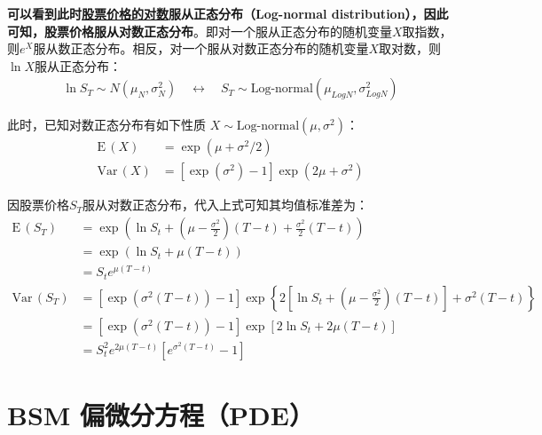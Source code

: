 \documentclass[11pt]{article}
\def\Var{{\textrm{Var}}\,}
\def\E{{\textrm{E}}\,}
\begin{document}
\textbf{可以看到此时\underline{股票价格的对数}服从正态分布（Log-normal distribution），因此可知，股票价格服从对数正态分布}。即对一个服从正态分布的随机变量$X$取指数，则$e^X$服从数正态分布。相反，对一个服从对数正态分布的随机变量$X$取对数，则$\ln X$服从正态分布：
\begin{align*}
    \ln S_T \sim N(\mu_{N},\sigma_{N}^2) \quad \leftrightarrow \quad S_T \sim \text{Log-normal}(\mu_{LogN},\sigma_{LogN}^2)
\end{align*}

此时，已知对数正态分布有如下性质 $X \sim \text{Log-normal}(\mu,\sigma^2)$：
\begin{align*}
    \E(X) & = \exp(\mu+\sigma^2/2) \\
    \Var(X) & = [\exp(\sigma^2)-1]\exp(2\mu+\sigma^2)
\end{align*}

因股票价格$S_T$服从对数正态分布，代入上式可知其均值标准差为：
\begin{align*}
    \E(S_T)   & = \exp(\ln S_t + (\mu - \frac{\sigma^2}{2})(T-t)+\frac{\sigma^2}{2}(T-t)) \\
    & = \exp(\ln S_t + \mu(T-t)) \\
    & = S_t e^{\mu(T-t)} \\
    \Var(S_T) & = \left[\exp(\sigma^2(T-t))-1\right] \exp \left\{2\left[\ln S_t + (\mu - \frac{\sigma^2}{2})(T-t)\right] + \sigma^2(T-t)\right\} \\
    & = \left[\exp(\sigma^2(T-t))-1\right] \exp\left[2 \ln S_t + 2\mu (T-t)\right] \\
    & = S_t^2 e^{2\mu(T-t)} \left[ e^{\sigma^2 (T-t)} - 1 \right]
\end{align*}


\section{BSM 偏微分方程（PDE）}
\end{document}
